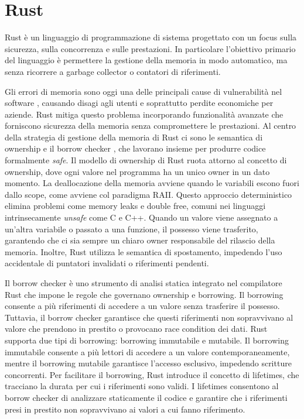 \section[Rust]{Rust}

Rust è un linguaggio di programmazione di sistema progettato con un focus sulla sicurezza, sulla concorrenza e sulle prestazioni. In particolare l'obiettivo primario del linguaggio è permettere la gestione della memoria in modo automatico, ma senza ricorrere a garbage collector o contatori di riferimenti. 

Gli errori di memoria sono oggi una delle principali cause di vulnerabilità nel software \cite[]{Mic:memory_safety}, causando disagi agli utenti e soprattutto perdite economiche per aziende. Rust mitiga questo problema incorporando funzionalità avanzate che forniscono sicurezza della memoria senza compromettere le prestazioni. Al centro della strategia di gestione della memoria di Rust ci sono le semantica di ownership e il borrow checker \cite[]{Rust:borrow_checker}, che lavorano insieme per produrre codice formalmente \textit{safe}. Il modello di ownership di Rust ruota attorno al concetto di ownership, dove ogni valore nel programma ha un unico owner in un dato momento. La deallocazione della memoria avviene quando le variabili escono fuori dallo scope, come avviene col paradigma RAII. Questo approccio deterministico elimina problemi come memory leaks e double free, comuni nei linguaggi intrinsecamente \textit{unsafe} come C e C++. Quando un valore viene assegnato a un'altra variabile o passato a una funzione, il possesso viene trasferito, garantendo che ci sia sempre un chiaro owner responsabile del rilascio della memoria. Inoltre, Rust utilizza le semantica di spostamento, impedendo l'uso accidentale di puntatori invalidati o riferimenti pendenti.

Il borrow checker è uno strumento di analisi statica integrato nel compilatore Rust che impone le regole che governano ownership e borrowing. Il borrowing consente a più riferimenti di accedere a un valore senza trasferire il possesso. Tuttavia, il borrow checker garantisce che questi riferimenti non sopravvivano al valore che prendono in prestito o provocano race condition dei dati. Rust supporta due tipi di borrowing: borrowing immutabile e mutabile. Il borrowing immutabile consente a più lettori di accedere a un valore contemporaneamente, mentre il borrowing mutabile garantisce l'accesso esclusivo, impedendo scritture concorrenti. Per facilitare il borrowing, Rust introduce il concetto di lifetimes, che tracciano la durata per cui i riferimenti sono validi. I lifetimes consentono al borrow checker di analizzare staticamente il codice e garantire che i riferimenti presi in prestito non sopravvivano ai valori a cui fanno riferimento.

